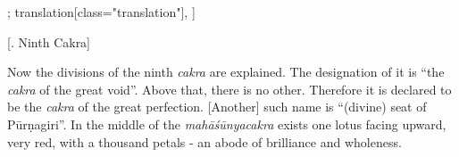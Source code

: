 \begin{alignment}[
  texts=edition[class="edition"];
  translation[class="translation"],
  ]
\begin{translation}
\begin{tlate}
      \end{tlate}
    \bigskip
    \centerline{\textrm{\small{[.\textsuperscript{} Ninth Cakra]}}}
    \label{cakra9trans}
    \bigskip
    \begin{tlate}
      Now the divisions of the ninth \textit{cakra} are explained. The designation of it is ``the \textit{cakra} of the great void''. Above that, there is no other. Therefore it is declared to be the \textit{cakra} of the great perfection. [Another] such name is ``(divine) seat of Pūrṇagiri''.\textsuperscript{\coro{[\lowroman{5}]}} In the middle of the \textit{mahāśūnyacakra} exists one lotus facing upward, very red, with a thousand petals - an abode of brilliance and wholeness.
      \vspace*{\fill} 
    \end{tlate}
  \end{translation}
     \ekdpb*{}
\end{alignment}
